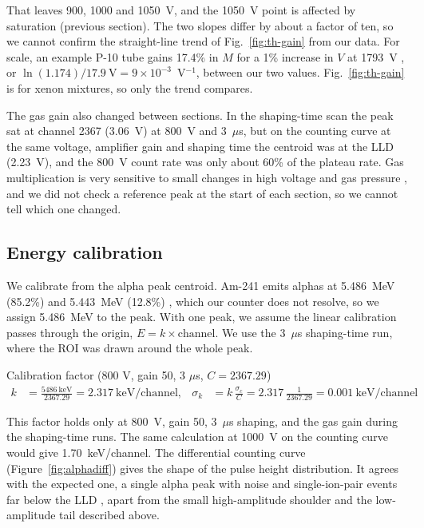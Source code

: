\documentclass[12pt]{article}
\begin{document}
That leaves 900, 1000 and 1050~V, and the 1050~V point is affected by saturation (previous section). The two slopes differ by about a factor of ten, so we cannot confirm the straight-line trend of Fig.~\ref{fig:th-gain} from our data. For scale, an example P-10 tube gains 17.4\% in $M$ for a 1\% increase in $V$ at 1793~V \cite{knoll}, or $\ln(1.174)/17.9\ \text{V} = 9\times10^{-3}$~V$^{-1}$, between our two values. Fig.~\ref{fig:th-gain} is for xenon mixtures, so only the trend compares.
 
The gas gain also changed between sections. In the shaping-time scan the peak sat at channel 2367 (3.06~V) at 800~V and 3~$\mu$s, but on the counting curve at the same voltage, amplifier gain and shaping time the centroid was at the LLD (2.23~V), and the 800~V count rate was only about 60\% of the plateau rate. Gas multiplication is very sensitive to small changes in high voltage and gas pressure \cite{knoll}, and we did not check a reference peak at the start of each section, so we cannot tell which one changed.
 
\subsection{Energy calibration}
 
We calibrate from the alpha peak centroid. Am-241 emits alphas at 5.486~MeV (85.2\%) and 5.443~MeV (12.8\%) \cite{knoll}, which our counter does not resolve, so we assign 5.486~MeV to the peak. With one peak, we assume the linear calibration passes through the origin, $E = k \times \text{channel}$. We use the 3~$\mu$s shaping-time run, where the ROI was drawn around the whole peak.
 
\begin{samplecalc}{Calibration factor (800 V, gain 50, 3 $\mu$s, $C = 2367.29$)}
\begin{align*}
k &= \frac{5486\ \text{keV}}{2367.29} = 2.317\ \text{keV/channel}, &
\sigma_k &= k\,\frac{\sigma_c}{C} = 2.317\,\frac{1}{2367.29} = 0.001\ \text{keV/channel}
\end{align*}
\end{samplecalc}
 
This factor holds only at 800~V, gain 50, 3~$\mu$s shaping, and the gas gain during the shaping-time runs. The same calculation at 1000~V on the counting curve would give 1.70~keV/channel. The differential counting curve (Figure~\ref{fig:alphadiff}) gives the shape of the pulse height distribution. It agrees with the expected one, a single alpha peak with noise and single-ion-pair events far below the LLD \cite{knoll}, apart from the small high-amplitude shoulder and the low-amplitude tail described above.
 
\end{document}
